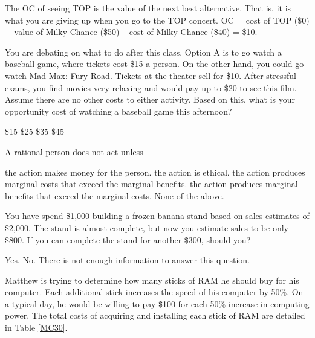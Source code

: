 \documentclass[addpoints,11pt]{exam}
\theoremstyle{definition}
\begin{document}
\begin{questions}
	\begin{solution}
		The OC of seeing TOP is the value of the next best alternative. That is, it is what you are giving up when you go to the TOP concert. OC = cost of TOP (\$0) + value of Milky Chance (\$50) -- cost of Milky Chance (\$40) = \$10.
	\end{solution}
	
	\question You are debating on what to do after this class. Option A is to go watch a baseball game, where tickets cost \$15 a person. On the other hand, you could go watch Mad Max: Fury Road. Tickets at the theater sell for \$10. After stressful exams, you find movies very relaxing and would pay up to \$20 to see this film. Assume there are no other costs to either activity. Based on this, what is your opportunity cost of watching a baseball game this afternoon?
	
	\begin{choices}
		\choice \$15
		\CorrectChoice \$25
		\choice \$35
		\choice \$45
	\end{choices}
	
	\question A rational person does not act unless
	
	\begin{choices}
	\choice	the action makes money for the person.
	\choice the action is ethical.
	\choice the action produces marginal costs that exceed the marginal benefits.
	\CorrectChoice the action produces marginal benefits that exceed the marginal costs.
	\choice None of the above.
	\end{choices}
	
\newpage
	
	\question You have spend \$1,000 building a frozen banana stand based on sales estimates of \$2,000. The stand is almost complete, but now you estimate sales to be only \$800. If you can complete the stand for another \$300, should you?
	
	\begin{choices}
		\CorrectChoice Yes.
		\choice No.
		\choice There is not enough information to answer this question.
	\end{choices}	
	
	\question Matthew is trying to determine how many sticks of RAM he should buy for his computer. Each additional stick increases the speed of his computer by 50\%. On a typical day, he would be willing to pay \$100 for each 50\% increase in computing power. The total costs of acquiring and installing each stick of RAM are detailed in Table \ref{MC30}. 
	

\end{questions}
\end{document}
